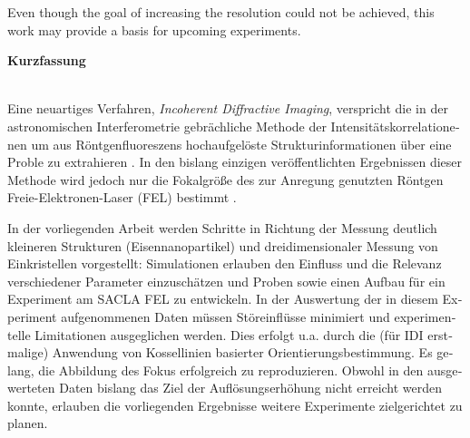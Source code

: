 Even though the goal of increasing the resolution could not be achieved, this work may provide a basis for upcoming experiments.





\clearpage
 
 \begin{otherlanguage}{german}
 \begin{Huge}
 	\textbf{Kurzfassung}\vspace{12mm}
 \end{Huge}
\\
Eine neuartiges Verfahren, \textit{Incoherent Diffractive Imaging}, verspricht die in der astronomischen Interferometrie gebrächliche Methode der Intensitätskorrelationenen um aus Röntgenfluoreszens hochaufgelöste Strukturinformationen über eine Proble zu extrahieren \cite{classen2017}.  
In den bislang einzigen veröffentlichten Ergebnissen dieser Methode wird jedoch nur  die Fokalgröße des zur Anregung genutzten Röntgen Freie-Elektronen-Laser (FEL) bestimmt \cite{nakumura2020}.

In der vorliegenden Arbeit werden Schritte in Richtung der Messung deutlich kleineren Strukturen (Eisennanopartikel) und dreidimensionaler Messung von Einkristellen vorgestellt: Simulationen erlauben den Einfluss und die Relevanz verschiedener Parameter einzuschätzen und Proben sowie einen Aufbau für ein Experiment am SACLA FEL zu entwickeln. In der Auswertung der in diesem Experiment aufgenommenen Daten müssen Störeinflüsse minimiert und experimentelle Limitationen ausgeglichen werden. Dies erfolgt u.a. durch die (für IDI erstmalige) Anwendung von Kossellinien basierter Orientierungsbestimmung.  
Es gelang, die Abbildung des Fokus erfolgreich zu reproduzieren.  Obwohl in den ausgewerteten Daten bislang das Ziel der Auflösungserhöhung nicht erreicht werden konnte, erlauben die vorliegenden Ergebnisse weitere Experimente zielgerichtet zu planen.
\end{otherlanguage}